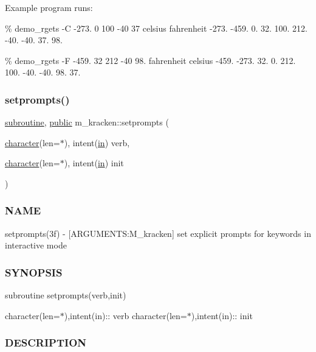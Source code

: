 Example program runs\+:

\% demo\+\_\+rgets -\/C -\/273. 0 100 -\/40 37 celsius fahrenheit -\/273. -\/459. 0. 32. 100. 212. -\/40. -\/40. 37. 98.

\% demo\+\_\+rgets -\/F -\/459. 32 212 -\/40 98. fahrenheit celsius -\/459. -\/273. 32. 0. 212. 100. -\/40. -\/40. 98. 37. \mbox{\label{namespacem__kracken_aab831b470a3107ca69833e717e95eaec}} 
\subsubsection{\texorpdfstring{setprompts()}{setprompts()}}
{\footnotesize\ttfamily \hyperlink{M__stopwatch_83_8txt_acfbcff50169d691ff02d4a123ed70482}{subroutine}, \hyperlink{M__stopwatch_83_8txt_a2f74811300c361e53b430611a7d1769f}{public} m\+\_\+kracken\+::setprompts (\begin{DoxyParamCaption}\item[{\hyperlink{option__stopwatch_83_8txt_abd4b21fbbd175834027b5224bfe97e66}{character}(len=$\ast$), intent(\hyperlink{M__journal_83_8txt_afce72651d1eed785a2132bee863b2f38}{in})}]{verb,  }\item[{\hyperlink{option__stopwatch_83_8txt_abd4b21fbbd175834027b5224bfe97e66}{character}(len=$\ast$), intent(\hyperlink{M__journal_83_8txt_afce72651d1eed785a2132bee863b2f38}{in})}]{init }\end{DoxyParamCaption})}



\subsubsection*{N\+A\+ME}

setprompts(3f) -\/ \mbox{[}A\+R\+G\+U\+M\+E\+N\+TS\+:M\+\_\+kracken\mbox{]} set explicit prompts for keywords in interactive mode \subsubsection*{S\+Y\+N\+O\+P\+S\+IS}

subroutine setprompts(verb,init)

character(len=$\ast$),intent(in)\+:\+: verb character(len=$\ast$),intent(in)\+:\+: init

\subsubsection*{D\+E\+S\+C\+R\+I\+P\+T\+I\+ON}

